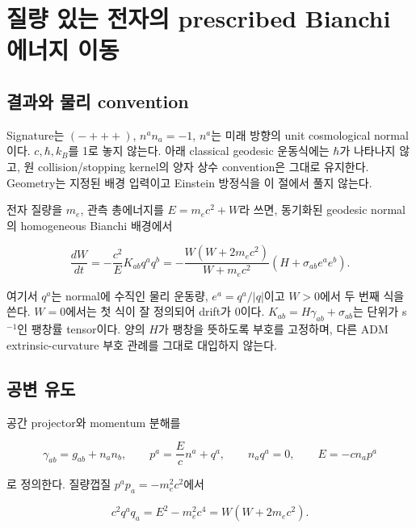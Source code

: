 \documentclass[11pt,a4paper]{article}
\begin{document}
\clearpage

\hypertarget{uxc9c8uxb7c9-uxc788uxb294-uxc804uxc790uxc758-prescribed-bianchi-uxc5d0uxb108uxc9c0-uxc774uxb3d9}{%
\section{질량 있는 전자의 prescribed Bianchi 에너지 이동}\label{uxc9c8uxb7c9-uxc788uxb294-uxc804uxc790uxc758-prescribed-bianchi-uxc5d0uxb108uxc9c0-uxc774uxb3d9}}

\hypertarget{uxacb0uxacfcuxc640-uxbb3cuxb9ac-convention}{%
\subsection{결과와 물리 convention}\label{uxacb0uxacfcuxc640-uxbb3cuxb9ac-convention}}

Signature는 \((-+++)\), \(n^an_a=-1\), \(n^a\)는 미래 방향의 unit cosmological normal이다. \(c,\hbar,k_B\)를 1로 놓지 않는다. 아래 classical geodesic 운동식에는 \(\hbar\)가 나타나지 않고, 원 collision/stopping kernel의 양자 상수 convention은 그대로 유지한다. Geometry는 지정된 배경 입력이고 Einstein 방정식을 이 절에서 풀지 않는다.

전자 질량을 \(m_e\), 관측 총에너지를 \(E=m_ec^2+W\)라 쓰면, 동기화된 geodesic normal의 homogeneous Bianchi 배경에서

\[\frac{dW}{dt}=-\frac{c^2}{E}K_{ab}q^aq^b
=-\frac{W(W+2m_ec^2)}{W+m_ec^2}\left(H+\sigma_{ab}e^ae^b\right).\tag{BG.1}\]

여기서 \(q^a\)는 normal에 수직인 물리 운동량, \(e^a=q^a/|q|\)이고 \(W>0\)에서 두 번째 식을 쓴다. \(W=0\)에서는 첫 식이 잘 정의되어 drift가 0이다. \(K_{ab}=H\gamma_{ab}+\sigma_{ab}\)는 단위가 s\(^{-1}\)인 팽창률 tensor이다. 양의 \(H\)가 팽창을 뜻하도록 부호를 고정하며, 다른 ADM extrinsic-curvature 부호 관례를 그대로 대입하지 않는다.

\hypertarget{uxacf5uxbcc0-uxc720uxb3c4}{%
\subsection{공변 유도}\label{uxacf5uxbcc0-uxc720uxb3c4}}

공간 projector와 momentum 분해를

\[\gamma_{ab}=g_{ab}+n_an_b,\qquad p^a=\frac Ec n^a+q^a,\qquad n_aq^a=0,\qquad E=-cn_ap^a\tag{BG.2}\]

로 정의한다. 질량껍질 \(p^ap_a=-m_e^2c^2\)에서

\[c^2q^aq_a=E^2-m_e^2c^4=W(W+2m_ec^2).\tag{BG.3}\]
\end{document}
